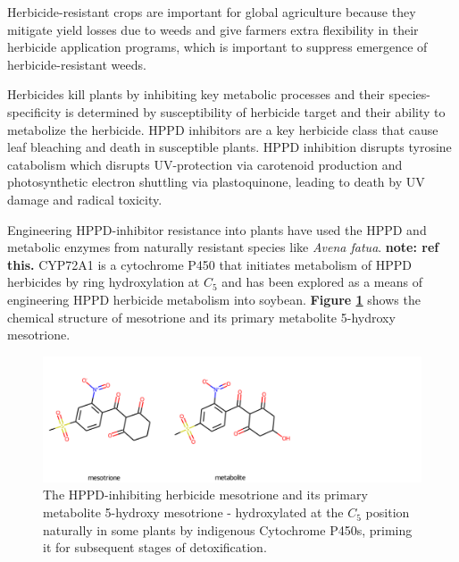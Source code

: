 \documentclass{article}
\begin{document}
Herbicide-resistant crops are important for global agriculture because they mitigate yield losses due to weeds and give farmers extra flexibility in their herbicide application programs, which is important to suppress emergence of herbicide-resistant weeds. %
\par
Herbicides kill plants by inhibiting key metabolic processes and their species-specificity is determined by susceptibility of herbicide target and their ability to  metabolize the herbicide. %
HPPD inhibitors are a key herbicide class that cause leaf bleaching and death in susceptible plants. 
HPPD inhibition  disrupts tyrosine catabolism which disrupts UV-protection via carotenoid production and photosynthetic electron shuttling via plastoquinone, leading to death by UV damage and radical toxicity. %
\par
Engineering HPPD-inhibitor resistance into plants have used the HPPD and metabolic enzymes from naturally resistant species like \textit{Avena fatua}. 
\textbf{note: ref this.}
CYP72A1 is a cytochrome P450 that initiates metabolism of HPPD herbicides by ring hydroxylation at $C_5$ and has been explored as a means of engineering HPPD herbicide metabolism into soybean.
\textbf{Figure \ref{mesotrione}} shows the chemical structure of mesotrione and its primary metabolite 5-hydroxy mesotrione. %

\begin{figure}
	\begin{center}
	\caption{\label{mesotrione} The HPPD-inhibiting herbicide mesotrione and its primary metabolite 5-hydroxy mesotrione - hydroxylated at the $C_5$ position naturally in some plants by indigenous Cytochrome P450s, priming it for subsequent stages of detoxification.}
	\includegraphics[width = \textwidth]{img/mesotrione+metabolite.png}
	\end{center}
\end{figure}
\end{document}
